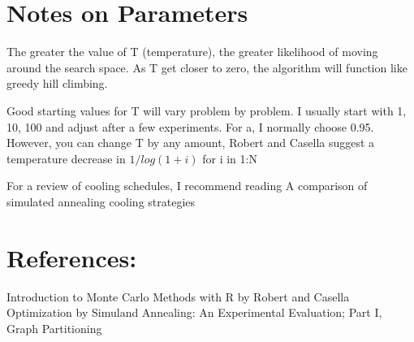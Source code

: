 \documentclass{article}
\begin{document}
 \section*{Notes on Parameters}
The greater the value of T (temperature), the greater likelihood of moving around the search space. As T get closer to zero, the algorithm will function like greedy hill climbing.

\noindent Good starting values for T will vary problem by problem. I usually start with 1, 10, 100 and adjust after a few experiments. For a, I normally choose 0.95. However, you can change T by any amount, Robert and Casella suggest a temperature decrease in $1/log(1+i)$ for i in 1:N


\noindent For a review of cooling schedules, I recommend reading A comparison of simulated annealing cooling strategies

\section*{References:}

Introduction to Monte Carlo Methods with R by Robert and Casella
\noindent Optimization by Simuland Annealing: An Experimental Evaluation; Part I, Graph Partitioning
\end{document}
